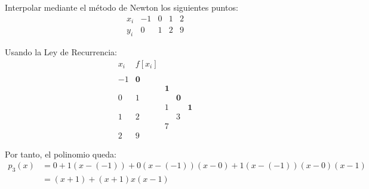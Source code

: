 \begin{ejemplo}
    Interpolar mediante el método de Newton los siguientes puntos:
    \begin{equation*}
        \begin{array}{c|cccc}
            x_i & -1 & 0 & 1 & 2 \\ \hline
            y_i & 0 & 1 & 2 & 9
        \end{array}
    \end{equation*}

    Usando la Ley de Recurrencia:
    \begin{equation*}
        \begin{array}{c|cccc}
            x_i & f[x_i] \\
            \\
            -1 & \textbf{0} \\
            && \textbf{1}\\
            0 & 1 & & \textbf{0}\\
            && 1&&\textbf{1}\\
            1 & 2 && 3\\
            & & 7\\
            2 & 9
        \end{array}
    \end{equation*}

    Por tanto, el polinomio queda:
    \begin{equation*}\begin{split}
        p_3(x) &= 0 + 1(x-(-1)) + 0(x-(-1))(x-0) + 1(x-(-1))(x-0)(x-1) \\
        &= (x+1)+(x+1)x(x-1)
    \end{split}\end{equation*}
\end{ejemplo}

